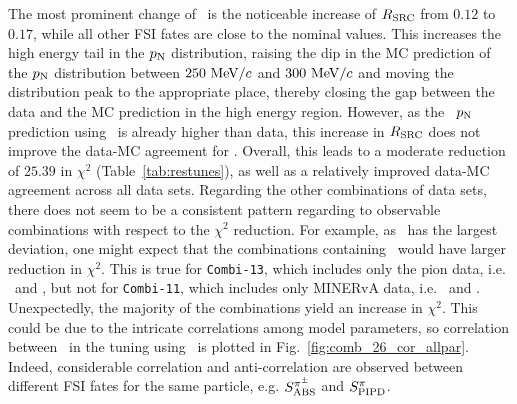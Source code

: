     The most prominent change of \gT\ is the noticeable increase of $R_\textrm{SRC}$ from $0.12$ to $0.17$, while all other FSI fates are close to the nominal values.
    This increases the high energy tail in the $p_\textrm{N}$ distribution, raising the dip in the MC prediction of the $p_\textrm{N}$ distribution between $250~\textrm{MeV}/c$ and $300~\textrm{MeV}/c$ and moving the distribution peak to the appropriate place, thereby closing the gap between the data and the MC prediction in the high energy region.
    However, as the \minpiz\ $p_\textrm{N}$ prediction using \gZero\ is already higher than data, this increase in $R_\textrm{SRC}$ does not improve the data-MC agreement for \minpiz.
    Overall, this leads to a moderate reduction of $25.39$ in $\chi^2$ (Table~\ref{tab:restunes}), as well as a relatively improved data-MC agreement across all data sets. 
    Regarding the other combinations of data sets, there does not seem to be a consistent pattern regarding to observable combinations with respect to the $\chi^2$ reduction.
    For example, as \minpiz\ has the largest deviation, one might expect that the combinations containing \minpiz\ would have larger reduction in $\chi^2$. 
    This is true for \texttt{Combi-13}, which includes only the pion data, i.e. \ttkpip\ and \minpiz, but not for \texttt{Combi-11}, which includes only MINERvA data, i.e. \minzpi\ and \minpiz.
    Unexpectedly, the majority of the combinations yield an increase in $\chi^2$.
    This could be due to the intricate correlations among model parameters, so correlation between \allpar\ in the tuning using \cbAllPar\ is plotted in Fig.~\ref{fig:comb_26_cor_allpar}.
    Indeed, considerable correlation and anti-correlation are observed between different FSI fates for the same particle, e.g. $S_\textrm{ABS}^{\pi^{\pm}}$ and $S_\textrm{PIPD}^{\pi}$. 
